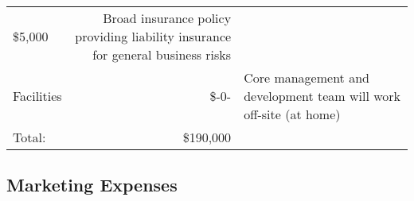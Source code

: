 \documentclass[10pt,openany]{book}
\begin{document}
\begin{longtable}[]{@{}lrl@{}}
\begin{minipage}[t]{0.12\columnwidth}
\$5,000\strut
\end{minipage} & \begin{minipage}[t]{0.48\columnwidth}\raggedright
Broad insurance policy providing liability insurance for general
business risks\strut
\end{minipage}\tabularnewline
\begin{minipage}[t]{0.31\columnwidth}\raggedright
Facilities\strut
\end{minipage} & \begin{minipage}[t]{0.12\columnwidth}\raggedleft
\$-0-\strut
\end{minipage} & \begin{minipage}[t]{0.48\columnwidth}\raggedright
Core management and development team will work off-site (at home)\strut
\end{minipage}\tabularnewline
\begin{minipage}[t]{0.31\columnwidth}\raggedright
Total:\strut
\end{minipage} & \begin{minipage}[t]{0.12\columnwidth}\raggedleft
\$190,000\strut
\end{minipage} & \begin{minipage}[t]{0.48\columnwidth}\raggedright
\strut
\end{minipage}\tabularnewline
\bottomrule
\end{longtable}

\hypertarget{marketing-expenses}{%
\subsection{Marketing Expenses}\label{marketing-expenses}}
\end{document}
